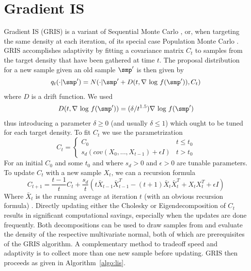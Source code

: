 \section{Gradient IS}
\label{sec:GRIS}
Gradient IS (GRIS) is a variant of Sequential Monte Carlo \cite{Doucet2001a}, or, when targeting the same density at each iteration, of its special case Population Monte Carlo \cite{Cappe2004}. GRIS accomplishes adaptivity by  fitting a covariance matrix $C_t$ to samples from the target density that have been gathered at time $t$. The proposal distribution for a new sample given an old sample $\smp'$   is then given by
\begin{equation*}
q_{t}(\cdot | \smp' ) = N(\cdot | \smp'  + D(t, \nabla~\textrm{log}~f(\smp' )), C_t)
\end{equation*}
 where $D$ is a drift function. We used $$D(t,  \nabla~\textrm{log}~f(\smp' )) = (\delta /t^{1.5})  \nabla~\textrm{log}~f(\smp' )$$ thus introducing a parameter $\delta \geq 0$ (and usually $\delta \leq 1$) which ought to be tuned for each target density. 
To fit $C_t$ we use the parametrization 
\begin{equation*}
C_t = \begin{cases}
C_0 & t \leq t_0 \\
s_d (cov(X_0,\dots, X_{t-1}) + \epsilon I)& t > t_0
\end{cases}
\end{equation*}
For an initial $C_0$ and some $t_0$ and where $s_d>0$ and $\epsilon>0$ are tunable parameters. To update $C_t$ with a new sample $X_t$, we can a recursion formula 
\begin{equation*}
C_{t+1} = \frac{t-1}{t} C_t + \frac{s_d}{t} \left (t\bar{X}_{t-1}\bar{X}^T_{t-1} - (t+1) \bar{X}_{t}\bar{X}^T_{t} + {X}_{t}{X}^T_{t}  + \epsilon I\right )
\end{equation*}
Where $\bar{X}_t$ is the running average at iteration $t$ (with an obvious recursion formula) \cite{Haario2001}.
Directly updating either the Cholesky or Eigendecomposition of $C_t$ results in significant computational savings, especially when the updates are done frequently. Both decompositions can be used to draw samples from and evaluate the density of the respective multivariate normal, both of which are prerequisites of the GRIS algorithm. A complementary method to tradeoff speed and adaptivity is to collect more than one new sample before updating. GRIS then proceeds as given in  Algorithm~\ref{algo:lis}.

